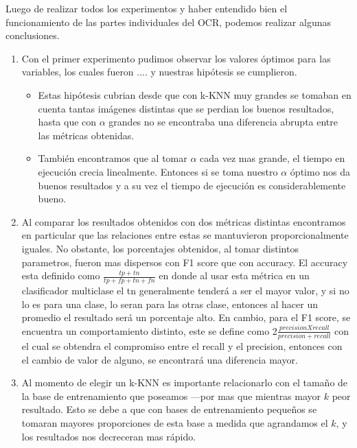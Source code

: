 Luego de realizar todos los experimentos y haber entendido bien el funcionamiento de las partes individuales del OCR, podemos realizar algunas conclusiones.

\begin{enumerate}
	\item Con el primer experimento pudimos observar los valores óptimos para las variables, los cuales fueron .... y nuestras hipótesis se cumplieron. 
	\begin{itemize}
		\item Estas hipótesis cubrian desde que con k-KNN muy grandes se tomaban en cuenta tantas imágenes distintas que se perdian los buenos resultados, hasta que con $\alpha$ grandes no se encontraba una diferencia abrupta entre las métricas obtenidas.
		\item También encontramos que al tomar $\alpha$ cada vez mas grande, el tiempo en ejecución crecia linealmente. Entonces si se toma nuestro $\alpha$ óptimo nos da buenos resultados y a su vez el tiempo de ejecución es considerablemente bueno.
	\end{itemize}
	\item Al comparar los resultados obtenidos con dos métricas distintas encontramos en particular que las relaciones entre estas se mantuvieron proporcionalmente iguales. No obstante, los porcentajes obtenidos, al tomar distintos parametros, fueron mas dispersos con F1 score que con accuracy. El accuracy esta definido como $\frac{tp + tn}{tp + fp + tn + fn}$ en donde al usar esta métrica en un clasificador multiclase el tn generalmente tenderá a ser el mayor valor, y si no lo es para una clase, lo seran para las otras clase, entonces al hacer un promedio el resultado será un porcentaje alto. En cambio, para el F1 score, se encuentra un comportamiento distinto, este se define como 2$\frac{precisionXrecall}{precision + recall}$ con el cual se obtendra el compromiso entre el recall y el precision, entonces con el cambio de valor de alguno, se encontrará una diferencia mayor.
	\item Al momento de elegir un k-KNN es importante relacionarlo con el tamaño de la base de entrenamiento que poseamos ---por mas que mientras mayor $k$ peor resultado. Esto se debe a que con bases de entrenamiento pequeños se tomaran mayores proporciones de esta base a medida que agrandamos el $k$, y los resultados nos decreceran mas rápido.

\end{enumerate}